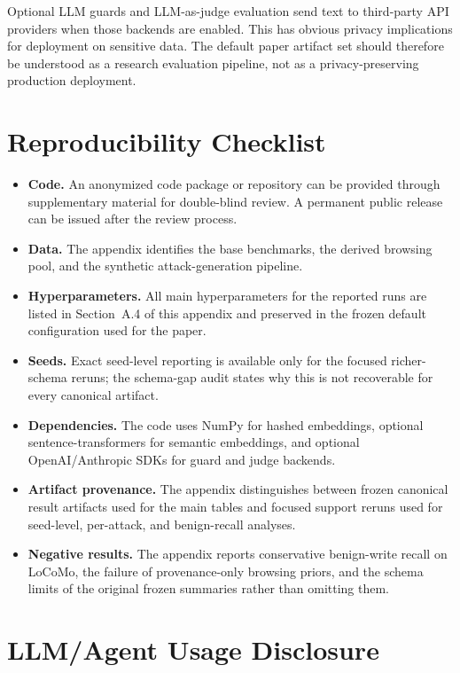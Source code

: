\documentclass{article}
\begin{document}
Optional LLM guards and LLM-as-judge evaluation send text to third-party API providers when those backends are enabled. This has obvious privacy implications for deployment on sensitive data. The default paper artifact set should therefore be understood as a research evaluation pipeline, not as a privacy-preserving production deployment.

\section{Reproducibility Checklist}

\begin{itemize}
\setlength{\itemsep}{1pt}
\setlength{\parskip}{0pt}
\setlength{\parsep}{0pt}
\setlength{\topsep}{2pt}
\item \textbf{Code.} An anonymized code package or repository can be provided through supplementary material for double-blind review. A permanent public release can be issued after the review process.
\item \textbf{Data.} The appendix identifies the base benchmarks, the derived browsing pool, and the synthetic attack-generation pipeline.
\item \textbf{Hyperparameters.} All main hyperparameters for the reported runs are listed in Section~A.4 of this appendix and preserved in the frozen default configuration used for the paper.
\item \textbf{Seeds.} Exact seed-level reporting is available only for the focused richer-schema reruns; the schema-gap audit states why this is not recoverable for every canonical artifact.
\item \textbf{Dependencies.} The code uses NumPy for hashed embeddings, optional sentence-transformers for semantic embeddings, and optional OpenAI/Anthropic SDKs for guard and judge backends.
\item \textbf{Artifact provenance.} The appendix distinguishes between frozen canonical result artifacts used for the main tables and focused support reruns used for seed-level, per-attack, and benign-recall analyses.
\item \textbf{Negative results.} The appendix reports conservative benign-write recall on LoCoMo, the failure of provenance-only browsing priors, and the schema limits of the original frozen summaries rather than omitting them.
\end{itemize}

\section*{LLM/Agent Usage Disclosure}
\end{document}
